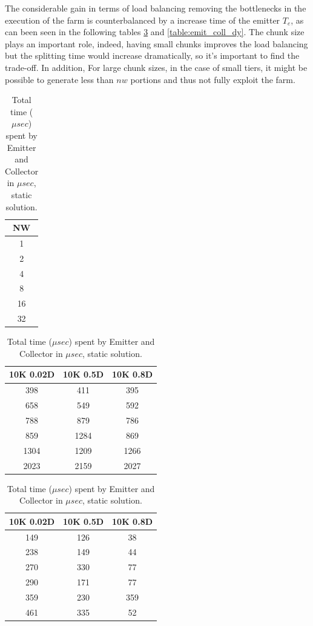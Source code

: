 The considerable gain in terms of load balancing removing the bottlenecks in the execution of the farm is counterbalanced by a increase time of the emitter $T_e$, as can been seen in the following tables \ref{table:emit_coll} and \ref{table:emit_coll_dy}. The chunk size plays an important role, indeed, having small chunks improves the load balancing but the splitting time would increase dramatically, so it's important to find the trade-off. In addition, For large chunk sizes, in the case of small tiers, it might be possible to generate less than $nw$ portions and thus not fully exploit the farm.

\begin{table}[!htb]
\centering
\begin{minipage}{0.08\textwidth}
\centering
\begin{tabular}{|c|}
\hline
NW \\ \hline
1          \\ \hline
2      \\ \hline
4           \\ \hline
8            \\ \hline
16       \\ \hline
32          \\ \hline
\end{tabular}
\end{minipage}
\begin{minipage}{0.43\textwidth}
\centering
\begin{tabular}{|c|c|c|}
\hline
 10K 0.02D & 10K 0.5D & 10K 0.8D \\ \hline
 398       & 411      & 395      \\ \hline
658       & 549     & 592       \\ \hline
 788      & 879      & 786      \\ \hline
 859      & 1284     & 869     \\ \hline
 1304      & 1209      & 1266 \\ \hline
 2023      & 2159     & 2027 \\ \hline
\end{tabular}

\end{minipage}
\begin{minipage}{0.43\textwidth}
\centering
\begin{tabular}{|c|c|c|}
\hline
 10K 0.02D & 10K 0.5D & 10K 0.8D \\ \hline
149       & 126      & 38       \\ \hline
238       & 149      & 44      \\ \hline
270       & 330      & 77       \\ \hline
290       & 171      & 77       \\ \hline
359       & 230      & 359      \\ \hline
461       & 335      & 52       \\ \hline
\end{tabular}
\end{minipage}
\caption{Total time ($\mu sec$) spent by Emitter and Collector in $\mu sec$, static solution.}
\label{table:emit_coll}
\end{table}

